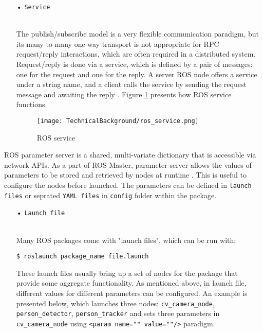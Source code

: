 \begin{description}[leftmargin=0in, labelindent=0pt]
{\begin{itemize}
\item[•] \texttt{Service} {\\
The publish/subscribe model is a very flexible communication paradigm, but its many-to-many one-way transport is not appropriate for RPC request/reply interactions, which are often required in a distributed system. Request/reply is done via a service, which is defined by a pair of messages: one for the request and one for the reply. A server ROS node offers a service under a string name, and a client calls the service by sending the request message and awaiting the reply \cite{rosservice}. Figure \ref{fig:ros_service} presents how ROS service functions.

\begin{figure}[H]
  \centering
  \texttt{[image: TechnicalBackground/ros\_service.png]}
  \caption{ROS service \cite{roseth2018}}
  \label{fig:ros_service}
\end{figure} 
} 
\end{itemize}
}

\item[Parameter Server] {
ROS parameter server is a shared, multi-variate dictionary that is accessible via network APIs. 
As a part of ROS Master, parameter server allows the values of parameters to be stored and retrieved by nodes at runtime \cite{rosparamserver}. This is useful to configure the nodes before launched. The parameters can be defined in \texttt{launch files} or seprated \texttt{YAML files} in \texttt{config} folder within the package.

\begin{itemize}%
\item[•] \texttt{Launch file}{\\
Many ROS packages come with "launch files", which can be run with:

\texttt{\$ roslaunch package\_name file.launch}

These launch files usually bring up a set of nodes for the package that provide some aggregate functionality. As mentioned above, in launch file, different values for different parameters can be configured. An example is presented below, which launches three nodes: \texttt{cv\_camera\_node}, \texttt{person\_detector}, \texttt{person\_tracker} and sets three parameters in \texttt{cv\_camera\_node} using \texttt{\textless{}param name="" value=""/\textgreater} paradigm.

}
\end{itemize}}
\end{description}
